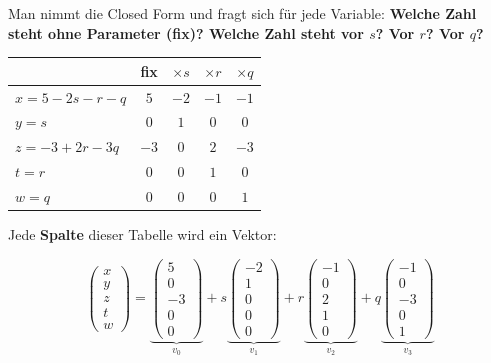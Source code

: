 \documentclass[a4paper,12pt]{article}
\begin{document}
Man nimmt die Closed Form und fragt sich für jede Variable: \textbf{Welche Zahl steht
ohne Parameter (fix)? Welche Zahl steht vor $s$? Vor $r$? Vor $q$?}

\begin{center}
\renewcommand{\arraystretch}{1.3}
\begin{tabular}{l|c|c|c|c}
 & fix & $\times s$ & $\times r$ & $\times q$ \\ \hline
$x = 5 - 2s - r - q$ & $5$ & $-2$ & $-1$ & $-1$ \\
$y = s$ & $0$ & $1$ & $0$ & $0$ \\
$z = -3 + 2r - 3q$ & $-3$ & $0$ & $2$ & $-3$ \\
$t = r$ & $0$ & $0$ & $1$ & $0$ \\
$w = q$ & $0$ & $0$ & $0$ & $1$ \\
\end{tabular}
\end{center}

Jede \textbf{Spalte} dieser Tabelle wird ein Vektor:

\[
\begin{pmatrix} x \\ y \\ z \\ t \\ w \end{pmatrix}
=
\underbrace{\begin{pmatrix} 5 \\ 0 \\ -3 \\ 0 \\ 0 \end{pmatrix}}_{v_0}
+ s \underbrace{\begin{pmatrix} -2 \\ 1 \\ 0 \\ 0 \\ 0 \end{pmatrix}}_{v_1}
+ r \underbrace{\begin{pmatrix} -1 \\ 0 \\ 2 \\ 1 \\ 0 \end{pmatrix}}_{v_2}
+ q \underbrace{\begin{pmatrix} -1 \\ 0 \\ -3 \\ 0 \\ 1 \end{pmatrix}}_{v_3}
\]
\end{document}
